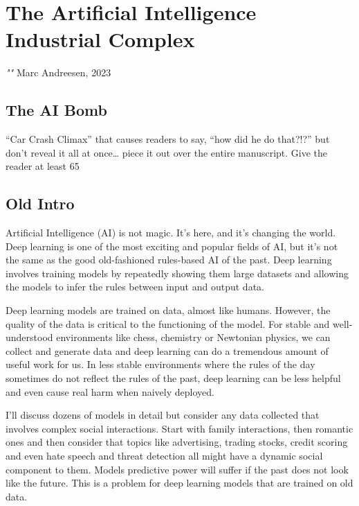 \setchapterpreamble[u]{\margintoc}
\chapter{The Artificial Intelligence Industrial Complex}

\textit{""} Marc Andreesen, 2023 \cite{welsh2023}

\section{The AI Bomb}

“Car Crash Climax” that causes readers to say, “how did he do that?!?” but don’t reveal it all at once… piece it out over the entire manuscript. Give the reader at least 65%






\section{Old Intro}

Artificial Intelligence (AI) is not magic. It's here, and it's changing the world. Deep learning is one of the most exciting and popular fields of AI, but it's not the same as the good old-fashioned rules-based AI of the past. Deep learning involves training models by repeatedly showing them large datasets and allowing the models to infer the rules between input and output data.

Deep learning models are trained on data, almost like humans. However, the quality of the data is critical to the functioning of the model. For stable and well-understood environments like chess, chemistry or Newtonian physics, we can collect and generate data and deep learning can do a tremendous amount of useful work for us. In less stable environments where the rules of the day sometimes do not reflect the rules of the past, deep learning can be less helpful and even cause real harm when naively deployed. 

I'll discuss dozens of models in detail but consider any data collected that involves complex social interactions. Start with family interactions, then romantic ones and then consider that topics like advertising, trading stocks, credit scoring and even hate speech and threat detection all might have a dynamic social component to them. Models predictive power will suffer if the past does not look like the future. This is a problem for deep learning models that are trained on old data.

